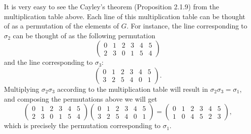 \begin{observation}
	 
	 \begin{example}
	 	It is very easy to see the Cayley's theorem (Proposition 2.1.9) from the multiplication table above. Each line of this multiplication table can be thought of as a permutation of the elements of $ G $. For instance, the line corresponding to $ \sigma_2 $ can be thought of as the following permutation
	 	\[ \begin{pmatrix}
	 		0 & 1 & 2 & 3 & 4 & 5 \\
	 		2 & 3 & 0 & 1 & 5 & 4 
	 	\end{pmatrix} \]
	 	and the line corresponding to $ \sigma_3 $:
	 	\[ \begin{pmatrix}
	 		0 & 1 & 2 & 3 & 4 & 5 \\
	 		3 & 2 & 5 & 4 & 0 & 1
	 	\end{pmatrix}. \]
	 	Multiplying $ \sigma_2 \sigma_3 $ according to the multiplication table will result in $ \sigma_2 \sigma_3 = \sigma_1 $, and composing the permutations above we will get
	 	\[ 
	 	\begin{pmatrix}
	 		0 & 1 & 2 & 3 & 4 & 5 \\
	 		2 & 3 & 0 & 1 & 5 & 4 
	 	\end{pmatrix} 
	 	\begin{pmatrix}
	 		0 & 1 & 2 & 3 & 4 & 5 \\
	 		3 & 2 & 5 & 4 & 0 & 1
	 	\end{pmatrix}
	 	=
	 	\begin{pmatrix}
	 		0 & 1 & 2 & 3 & 4 & 5 \\
	 		1 & 0 & 4 & 5 & 2 & 3
	 	\end{pmatrix},
	 	 \]
	 	 which is precisely the permutation corresponding to $ \sigma_1 $.
	 \end{example}
	 

\end{observation}
